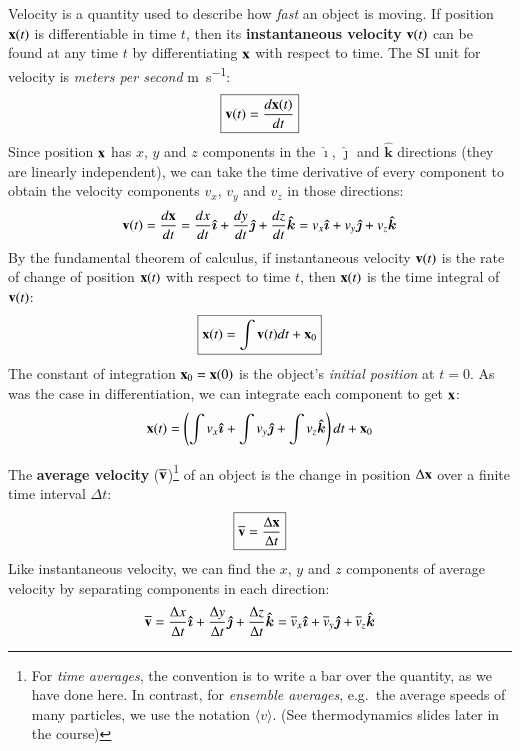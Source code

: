 \documentclass[11pt]{article}
\newcommand{\mb}[1]{\ensuremath\mathbf{#1}}
\begin{document}
Velocity is a quantity used to describe how \emph{fast} an object is moving. If
position $\mb{x}(t)$ is differentiable in time $t$, then its
\textbf{instantaneous velocity} $\mb{v}(t)$ can be found at any time $t$ by
differentiating $\mb{x}$ with respect to time. The SI unit for velocity is
\emph{meters per second} \si{\metre\per\second}:
\begin{equation}
  \boxed{\mb{v}(t)= \frac{d\mb{x}(t)}{dt}}
\end{equation}
Since position $\mb{x}$ has $x$, $y$ and $z$ components in the
$\bm{\hat{\imath}}$, $\bm{\hat{\jmath}}$ and $\bm{\hat{k}}$ directions (they
are linearly independent), we can take the time derivative of every component
to obtain the velocity components $v_x$, $v_y$ and $v_z$ in those directions:
\begin{equation*}
  \mb{v}(t)= \frac{d\mb{x}}{dt}=
  \frac{dx}{dt}\bm{\hat{\imath}} +
  \frac{dy}{dt}\bm{\hat{\jmath}} + \frac{dz}{dt}\bm{\hat{k}}=
  v_x\bm{\hat{\imath}} + v_y\bm{\hat{\jmath}} + v_z\bm{\hat{k}}
\end{equation*}
By the fundamental theorem of calculus, %
if instantaneous velocity $\mb{v}(t)$ is the rate of change of position
$\mb{x}(t)$ with respect to time $t$, then $\mb{x}(t)$ is the time integral of
$\mb{v}(t)$:
\begin{equation}
  \boxed{\mb{x}(t)=\int\mb{v}(t)dt + \mb{x}_0}
\end{equation}
The constant of integration $\mb{x}_0=\mb{x}(0)$ is the object's
\emph{initial position} at $t=0$. As was the case in differentiation,
we can integrate each component to get $\mb{x}$:
\begin{equation*}
  \mb{x}(t)= \left(
  \int v_x\bm{\hat{\imath}} + \int v_y\bm{\hat{\jmath}} + \int v_z\bm{\hat{k}}
  \right) dt + \mb{x}_0
\end{equation*}


The \textbf{average velocity} ($\overline{\mb{v}}$)\footnote{For
  \emph{time averages}, the convention is to write a bar over the quantity, as
  we have done here. In contrast, for \emph{ensemble averages}, e.g.\ the
  average speeds of many particles, we use the notation
  $\big\langle v\big\rangle$. (See thermodynamics slides later in the course)}
of an object is the change in position $\Delta\mb{x}$ over a finite time
interval $\Delta t$:
\begin{equation}
  \boxed{\overline{\mb{v}}= \frac{\Delta\mb{x}}{\Delta t}}
\end{equation}
Like instantaneous velocity, we can find the $x$, $y$ and $z$ components of
average velocity by separating components in each direction:
\begin{equation*}
  \overline{\mb{v}}=
  \frac{\Delta x}{\Delta t}\bm{\hat{\imath}} +
  \frac{\Delta y}{\Delta t}\bm{\hat{\jmath}} +
  \frac{\Delta z}{\Delta t}\bm{\hat{k}} =
  \overline{v}_x\bm{\hat{\imath}} +
  \overline{v}_y\bm{\hat{\jmath}} +
  \overline{v}_z\bm{\hat{k}}
\end{equation*}
%
%
%
\end{document}
